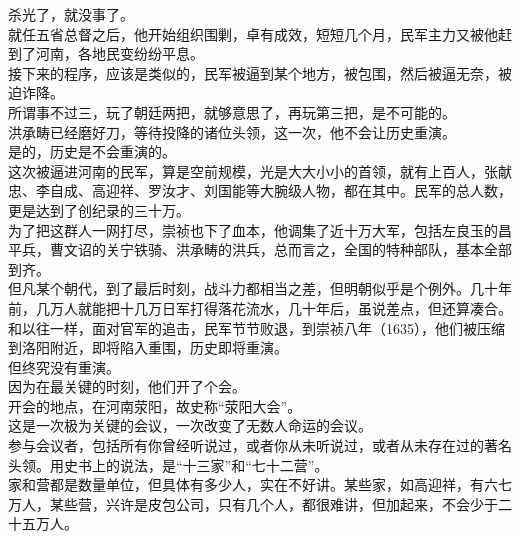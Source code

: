 \begin{multicols}{\theparacolNo}
杀光了，就没事了。\\

就任五省总督之后，他开始组织围剿，卓有成效，短短几个月，民军主力又被他赶到了河南，各地民变纷纷平息。\\

接下来的程序，应该是类似的，民军被逼到某个地方，被包围，然后被逼无奈，被迫诈降。\\

所谓事不过三，玩了朝廷两把，就够意思了，再玩第三把，是不可能的。\\

洪承畴已经磨好刀，等待投降的诸位头领，这一次，他不会让历史重演。\\

是的，历史是不会重演的。\\

这次被逼进河南的民军，算是空前规模，光是大大小小的首领，就有上百人，张献忠、李自成、高迎祥、罗汝才、刘国能等大腕级人物，都在其中。民军的总人数，更是达到了创纪录的三十万。\\

为了把这群人一网打尽，崇祯也下了血本，他调集了近十万大军，包括左良玉的昌平兵，曹文诏的关宁铁骑、洪承畴的洪兵，总而言之，全国的特种部队，基本全部到齐。\\

但凡某个朝代，到了最后时刻，战斗力都相当之差，但明朝似乎是个例外。几十年前，几万人就能把十几万日军打得落花流水，几十年后，虽说差点，但还算凑合。\\

和以往一样，面对官军的追击，民军节节败退，到崇祯八年（1635），他们被压缩到洛阳附近，即将陷入重围，历史即将重演。\\

但终究没有重演。\\

因为在最关键的时刻，他们开了个会。\\

开会的地点，在河南荥阳，故史称“荥阳大会”。\\

这是一次极为关键的会议，一次改变了无数人命运的会议。\\

参与会议者，包括所有你曾经听说过，或者你从未听说过，或者从未存在过的著名头领。用史书上的说法，是“十三家”和“七十二营”。\\

家和营都是数量单位，但具体有多少人，实在不好讲。某些家，如高迎祥，有六七万人，某些营，兴许是皮包公司，只有几个人，都很难讲，但加起来，不会少于二十五万人。\\


\end{multicols}

